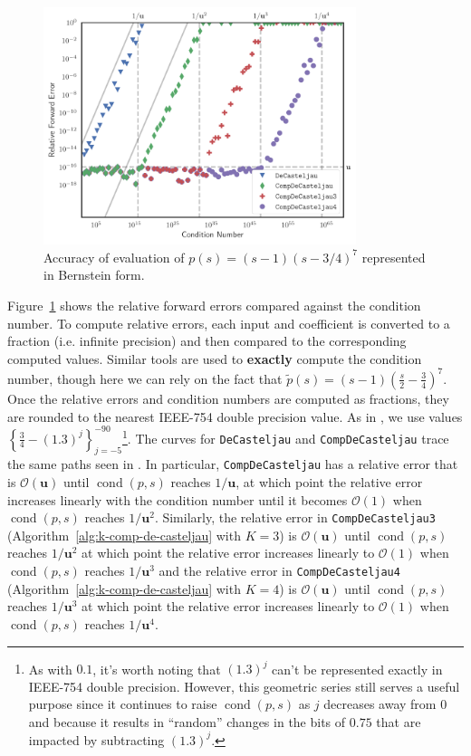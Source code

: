 \documentclass[letterpaper,10pt]{article}
\theoremstyle{definition}
\newcommand{\cond}[1]{\operatorname{cond}\left(#1\right)}
\newcommand{\mach}{\mathbf{u}}
\begin{document}
\begin{figure}
  \includegraphics[width=0.8125\textwidth]{../images/de_casteljau_rel_error.pdf}
  \centering
  \captionsetup{width=.75\linewidth}
  \caption{Accuracy of evaluation of \(p(s) = (s - 1)\left(s - 3/4\right)^7\)
    represented in Bernstein form.}
  \label{fig:compensated-k}
\end{figure}

Figure~\ref{fig:compensated-k} shows the relative forward errors compared
against the condition number. To compute relative errors, each input and
coefficient is converted to a fraction (i.e. infinite precision) and then
compared to the corresponding computed values. Similar tools are used to
\textbf{exactly} compute the condition number, though here we can rely
on the fact that \(\widetilde{p}\left(s\right) = (s - 1)
\left(\frac{s}{2} - \frac{3}{4}\right)^7\). Once the relative errors and
condition numbers are computed as fractions, they are rounded to the
nearest IEEE-754 double precision value. As in \cite{Jiang2010}, we use
values \(\left\{\frac{3}{4} - (1.3)^j\right\}_{j=-5}^{-90}\)\footnote{As with
\(0.1\), it's worth noting that \((1.3)^j\) can't be represented exactly in
IEEE-754 double precision. However, this geometric series still serves a
useful purpose since it continues to raise \(\cond{p, s}\) as \(j\) decreases
away from \(0\) and because it results in ``random'' changes in the bits of
\(0.75\) that are impacted by subtracting \((1.3)^j\).}. The curves for
\texttt{DeCasteljau} and \texttt{CompDeCasteljau} trace the same paths seen
in \cite{Jiang2010}. In particular, \texttt{CompDeCasteljau} has a relative
error that is \(\mathcal{O}(\mach)\) until \(\cond{p, s}\) reaches
\(1 / \mach\), at which point the relative error increases linearly with
the condition number until it becomes \(\mathcal{O}(1)\) when
\(\cond{p, s}\) reaches \(1 / \mach^2\).
Similarly, the relative error in \texttt{CompDeCasteljau3}
(Algorithm~\ref{alg:k-comp-de-casteljau} with \(K = 3\))
is \(\mathcal{O}(\mach)\) until \(\cond{p, s}\) reaches
\(1 / \mach^2\) at which point the relative error increases linearly
to \(\mathcal{O}(1)\) when \(\cond{p, s}\) reaches \(1 / \mach^3\)
and the relative error in \texttt{CompDeCasteljau4}
(Algorithm~\ref{alg:k-comp-de-casteljau} with \(K = 4\))
is \(\mathcal{O}(\mach)\) until \(\cond{p, s}\) reaches
\(1 / \mach^3\) at which point the relative error increases linearly
to \(\mathcal{O}(1)\) when \(\cond{p, s}\) reaches \(1 / \mach^4\).
\end{document}
